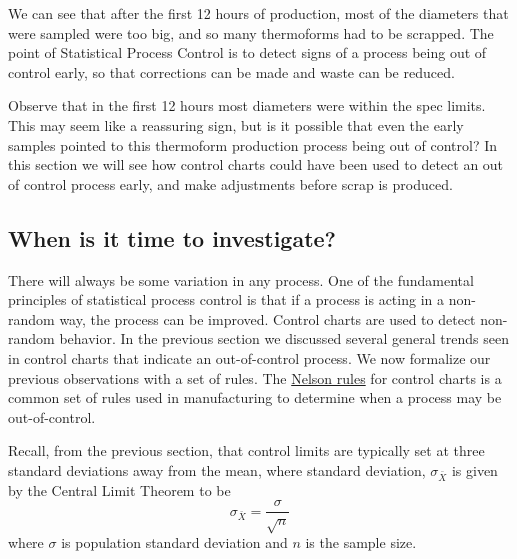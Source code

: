 \documentclass{ximera}
\begin{document}

We can see that after the first 12 hours of production, most of the diameters that were sampled were too big, and so many thermoforms had to be scrapped.  The point of Statistical Process Control is to detect signs of a process being out of control early, so that corrections can be made and waste can be reduced.  

Observe that in the first 12 hours most diameters were within the spec limits.  This may seem like a reassuring sign,  but is it possible that even the early samples pointed to this thermoform production process being out of control?  In this section we will see how control charts could have been used to detect an out of control process early, and make adjustments before scrap is produced.  

\subsection*{When is it time to investigate?}

There will always be some variation in any process.  %
One of the fundamental principles of statistical process control is that if a process is acting in a non-random way, the process can be improved.  Control charts are used to detect non-random behavior. In the previous section we discussed several general trends seen in control charts that indicate an out-of-control process.  We now formalize our previous observations with a set of rules.  The
 \href{https://www.qimacros.com/control-chart/nelson-rules/}{Nelson rules} for control charts is a common set of rules used in manufacturing to determine when a process may be out-of-control.  %

 Recall, from the previous section, that control limits are typically set at three standard deviations away from the mean, where standard deviation, $\sigma_{\bar{X}}$ is given by the Central Limit Theorem to be 
 $$\sigma_{\bar{X}}=\frac{\sigma}{\sqrt{n}}$$
 where $\sigma$ is population standard deviation and $n$ is the sample size.
\end{document}
